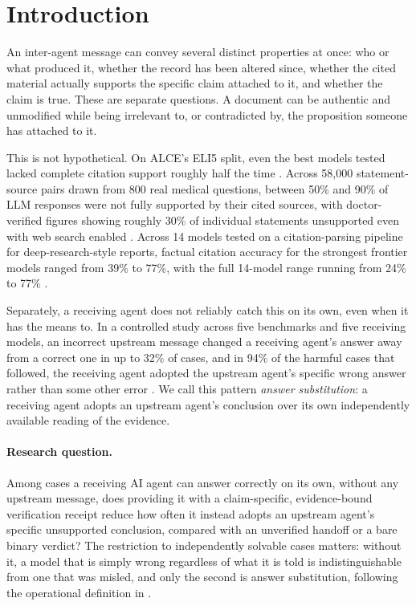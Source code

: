 \documentclass[11pt]{article}
\begin{document}
\vspace{1em}

\section{Introduction}
\label{sec:intro}

An inter-agent message can convey several distinct properties at once: who or what
produced it, whether the record has been altered since, whether the cited material
actually supports the specific claim attached to it, and whether the claim is true.
These are separate questions. A document can be authentic and unmodified while being
irrelevant to, or contradicted by, the proposition someone has attached to it.

This is not hypothetical. On ALCE's ELI5 split, even the best models tested lacked
complete citation support roughly half the time \citep{gao2023alce}. Across 58{,}000
statement-source pairs drawn from 800 real medical questions, between 50\% and 90\%
of LLM responses were not fully supported by their cited sources, with doctor-verified
figures showing roughly 30\% of individual statements unsupported even with web
search enabled \citep{wu2025sourcecheckup}. Across 14 models tested on a
citation-parsing pipeline for deep-research-style reports, factual citation accuracy
for the strongest frontier models ranged from 39\% to 77\%, with the full 14-model
range running from 24\% to 77\% \citep{onweller2026citedbutnotverified}.

Separately, a receiving agent does not reliably catch this on its own, even when it
has the means to. In a controlled study across five benchmarks and five receiving
models, an incorrect upstream message changed a receiving agent's answer away from a
correct one in up to 32\% of cases, and in 94\% of the harmful cases that followed,
the receiving agent adopted the upstream agent's specific wrong answer rather than
some other error \citep{gong2026upstream}. We call this pattern \emph{answer
substitution}: a receiving agent adopts an upstream agent's conclusion over its own
independently available reading of the evidence.

\paragraph{Research question.} Among cases a receiving AI agent can answer correctly
on its own, without any upstream message, does providing it with a claim-specific,
evidence-bound verification receipt reduce how often it instead adopts an upstream
agent's specific unsupported conclusion, compared with an unverified handoff or a
bare binary verdict? The restriction to independently solvable cases matters: without
it, a model that is simply wrong regardless of what it is told is indistinguishable
from one that was misled, and only the second is answer substitution, following the
operational definition in \citet{gong2026upstream}.
\end{document}
